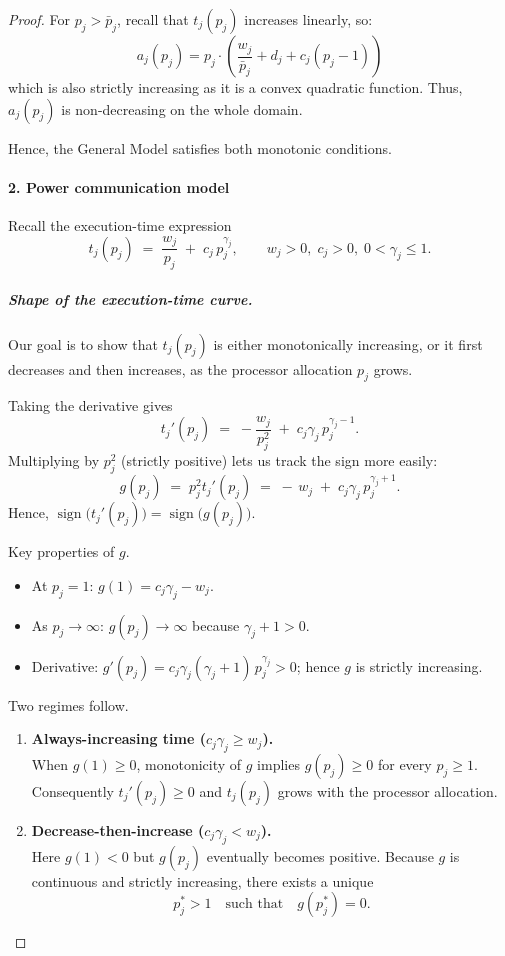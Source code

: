 \documentclass{article}
\begin{document}
\begin{proof}
For $p_j > \bar{p}_j$, recall that $t_j(p_j)$ increases linearly, so:
\[
a_j(p_j) = p_j \cdot \left( \frac{w_j}{\bar{p}_j} + d_j + c_j(p_j - 1) \right)
\]
which is also strictly increasing as it is a convex quadratic function. Thus, $a_j(p_j)$ is non-decreasing on the whole domain.

Hence, the General Model satisfies both monotonic conditions.

\paragraph{2. Power communication model}

Recall the execution-time expression
\[
t_j(p_j)\;=\;\frac{w_j}{p_j}\;+\;c_j\,p_j^{\gamma_j},
\qquad
w_j>0,\; c_j>0,\; 0<\gamma_j\le 1.
\]

\subparagraph*{Shape of the execution-time curve.}
Our goal is to show that \(t_j(p_j)\) is either monotonically increasing, or it first decreases and then increases, as the processor allocation \(p_j\) grows.

Taking the derivative gives
\[
t_j'(p_j)\;=\;-\frac{w_j}{p_j^{2}}\;+\;c_j\gamma_j\,p_j^{\gamma_j-1}.
\]
Multiplying by \(p_j^{2}\) (strictly positive) lets us track the sign more easily:
\[
g(p_j)\;=\;p_j^{2}t_j'(p_j)\;=\;-\,w_j\;+\;c_j\gamma_j\,p_j^{\gamma_j+1}.
\]
Hence, \(\operatorname{sign}\bigl(t_j'(p_j)\bigr)=\operatorname{sign}\bigl(g(p_j)\bigr)\).

\medskip
Key properties of \(g\).
\begin{itemize}
  \item At \(p_j=1\): \(g(1)=c_j\gamma_j-w_j\).
  \item As \(p_j\to\infty\): \(g(p_j)\to\infty\) because \(\gamma_j+1>0\).
  \item Derivative: \(g'(p_j)=c_j\gamma_j(\gamma_j+1)\,p_j^{\gamma_j}>0\); hence \(g\) is strictly increasing.
\end{itemize}

Two regimes follow.

\begin{enumerate}
\item \textbf{Always-increasing time (\(c_j\gamma_j\ge w_j\)).}\\
      When \(g(1)\ge 0\), monotonicity of \(g\) implies \(g(p_j)\ge 0\) for every \(p_j\ge 1\).
      Consequently \(t_j'(p_j)\ge 0\) and \(t_j(p_j)\) grows with the processor allocation.

\item \textbf{Decrease-then-increase (\(c_j\gamma_j< w_j\)).}\\
      Here \(g(1)<0\) but \(g(p_j)\) eventually becomes positive.
      Because \(g\) is continuous and strictly increasing, there exists a unique
      \[
      p_j^{\ast}>1\quad\text{such that}\quad g(p_j^{\ast})=0 .
      \]
\end{enumerate}


\end{proof}
\end{document}
